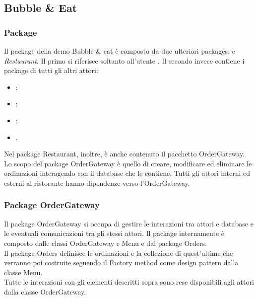 \subsection{Bubble \& Eat}

\subsubsection{Package}
Il package della demo Bubble \& eat è composto da due ulteriori packages: \Customer{} e \textit{Restaurant}. 
Il primo si riferisce soltanto all'utente \Customer{}. Il secondo invece contiene i package di tutti gli altri attori:
\begin{itemize}
	\item \Manager{};
	\item \Chef{};
	\item \Deliveryman{};
	\item \Purchasingmanager{}.
\end{itemize}
Nel package Restaurant, inoltre, è anche contenuto il pacchetto Order\-Gateway.\\
Lo scopo del package Order\-Gateway è quello di creare, modificare ed eliminare le ordinazioni interagendo con il database che le contiene.
Tutti gli attori interni ed esterni al ristorante hanno dipendenze verso l'Order\-Gateway.

\subsubsection{Package Order\-Gateway}
Il package Order\-Gateway si occupa di gestire le interazioni tra attori e database e le eventuali comunicazioni tra gli stessi attori. Il package internamente è composto dalle classi Order\-Gateway e Menu e dal package Orders.\\
Il package Orders definisce le ordinazioni e la collezione di quest'ultime che verranno poi costruite seguendo il Factory method come design pattern dalla classe Menu.\\
Tutte le interazioni con gli elementi descritti sopra sono rese disponibili agli attori dalla classe Order\-Gateway.

